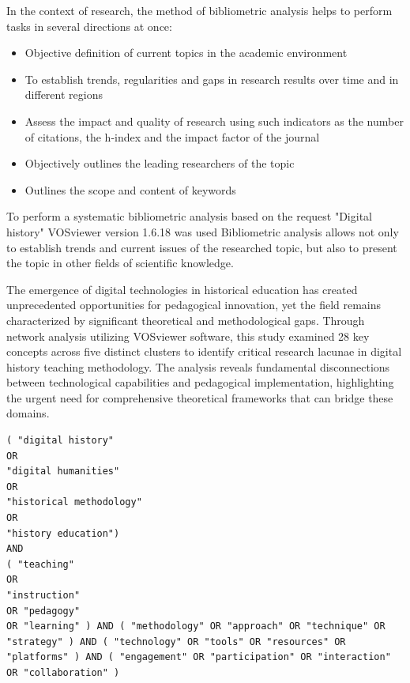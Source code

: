 
In the context of research, the method of bibliometric analysis helps to perform tasks in several directions at once:
\begin{itemize}
    \item Objective definition of current topics in the academic environment
    \item To establish trends, regularities and gaps in research results over time and in different regions
    \item Assess the impact and quality of research using such indicators as the number of citations, the h-index and the impact factor of the journal
    \item Objectively outlines the leading researchers of the topic
    \item Outlines the scope and content of keywords
\end{itemize}

To perform a systematic bibliometric analysis based on the request "Digital history" VOSviewer version 1.6.18 was used \cite{VOSviewer}
Bibliometric analysis allows not only to establish trends and current issues of the researched topic, but also to present the topic in other fields of scientific knowledge.

The emergence of digital technologies in historical education has created unprecedented opportunities for pedagogical innovation, yet the field remains characterized by significant theoretical and methodological gaps. Through network analysis utilizing VOSviewer software, this study examined 28 key concepts across five distinct clusters to identify critical research lacunae in digital history teaching methodology. The analysis reveals fundamental disconnections between technological capabilities and pedagogical implementation, highlighting the urgent need for comprehensive theoretical frameworks that can bridge these domains.


\begin{verbatim}
( "digital history" 
OR
"digital humanities" 
OR
"historical methodology" 
OR
"history education")
AND 
( "teaching" 
OR 
"instruction" 
OR "pedagogy"
OR "learning" ) AND ( "methodology" OR "approach" OR "technique" OR "strategy" ) AND ( "technology" OR "tools" OR "resources" OR "platforms" ) AND ( "engagement" OR "participation" OR "interaction" OR "collaboration" )

\end{verbatim}

